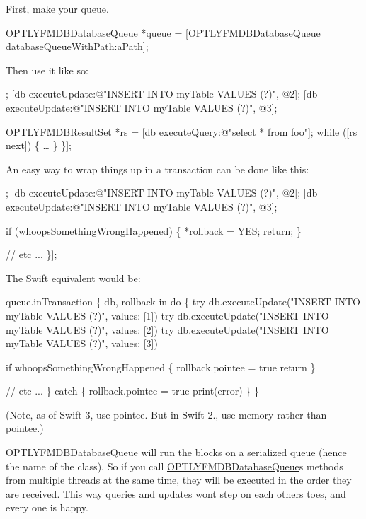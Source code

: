 First, make your queue.


\begin{DoxyCode}
OPTLYFMDBDatabaseQueue *queue = [OPTLYFMDBDatabaseQueue databaseQueueWithPath:aPath];
\end{DoxyCode}


Then use it like so\+:


\begin{DoxyCode}
[queue inDatabase:^(OPTLYFMDBDatabase *db) \{
    [db executeUpdate:@"INSERT INTO myTable VALUES (?)", @1];
    [db executeUpdate:@"INSERT INTO myTable VALUES (?)", @2];
    [db executeUpdate:@"INSERT INTO myTable VALUES (?)", @3];

    OPTLYFMDBResultSet *rs = [db executeQuery:@"select * from foo"];
    while ([rs next]) \{
        …
    \}
\}];
\end{DoxyCode}


An easy way to wrap things up in a transaction can be done like this\+:


\begin{DoxyCode}
[queue inTransaction:^(OPTLYFMDBDatabase *db, BOOL *rollback) \{
    [db executeUpdate:@"INSERT INTO myTable VALUES (?)", @1];
    [db executeUpdate:@"INSERT INTO myTable VALUES (?)", @2];
    [db executeUpdate:@"INSERT INTO myTable VALUES (?)", @3];

    if (whoopsSomethingWrongHappened) \{
        *rollback = YES;
        return;
    \}

    // etc ...
\}];
\end{DoxyCode}


The Swift equivalent would be\+:


\begin{DoxyCode}
queue.inTransaction \{ db, rollback in
    do \{
        try db.executeUpdate("INSERT INTO myTable VALUES (?)", values: [1])
        try db.executeUpdate("INSERT INTO myTable VALUES (?)", values: [2])
        try db.executeUpdate("INSERT INTO myTable VALUES (?)", values: [3])

        if whoopsSomethingWrongHappened \{
            rollback.pointee = true
            return
        \}

        // etc ...
    \} catch \{
        rollback.pointee = true
        print(error)
    \}
\}
\end{DoxyCode}


(Note, as of Swift 3, use {\ttfamily pointee}. But in Swift 2., use {\ttfamily memory} rather than {\ttfamily pointee}.)

{\ttfamily \mbox{\hyperlink{interface_o_p_t_l_y_f_m_d_b_database_queue}{O\+P\+T\+L\+Y\+F\+M\+D\+B\+Database\+Queue}}} will run the blocks on a serialized queue (hence the name of the class). So if you call {\ttfamily \mbox{\hyperlink{interface_o_p_t_l_y_f_m_d_b_database_queue}{O\+P\+T\+L\+Y\+F\+M\+D\+B\+Database\+Queue}}}\textquotesingle{}s methods from multiple threads at the same time, they will be executed in the order they are received. This way queries and updates won\textquotesingle{}t step on each other\textquotesingle{}s toes, and every one is happy.

